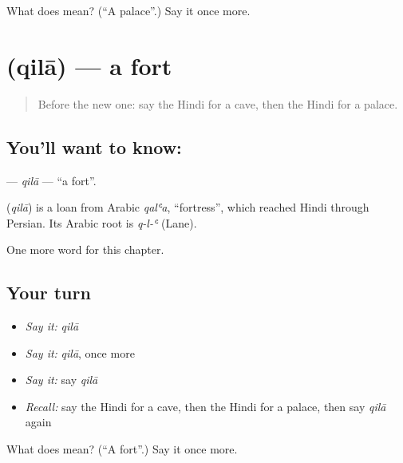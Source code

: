 \begin{tcolorbox}[breakable,colback=teal!4,colframe=teal!35!black,title={Before you move on}]
What does  mean? (\textquotedblleft{}A palace\textquotedblright{}.) Say it once more.
\end{tcolorbox}
\section[\texorpdfstring{\hi{क़िला} (qilā)}{क़िला (qilā)}]{ (qilā) — a fort}

\label{lesson:HI-C202-qila}



\begin{quote}
Before the new one: say the Hindi for a cave, then the Hindi for a palace.
\end{quote}

\subsection*{You'll want to know: }
\textbf{} — \emph{qilā} — \textquotedblleft{}a fort\textquotedblright{}.

\begin{cousinweb}
\textbf{} (\emph{qilā}) is a loan from Arabic \emph{qalʿa}, \textquotedblleft{}fortress\textquotedblright{}, which reached Hindi through Persian. Its Arabic root is \emph{q-l-ʿ} (Lane).
\end{cousinweb}

\begin{grammarlens}[title={What you've built}]
One more word for this chapter.
\end{grammarlens}

\subsection*{Your turn}
\begin{itemize}
\raggedright
  \item \emph{Say it:} \emph{qilā}
  \item \emph{Say it:} \emph{qilā}, once more
  \item \emph{Say it:} say \emph{qilā}
  \item \emph{Recall:} say the Hindi for a cave, then the Hindi for a palace, then say \emph{qilā} again
\end{itemize}

\begin{tcolorbox}[breakable,colback=teal!4,colframe=teal!35!black,title={Before you move on}]
What does  mean? (\textquotedblleft{}A fort\textquotedblright{}.) Say it once more.
\end{tcolorbox}
